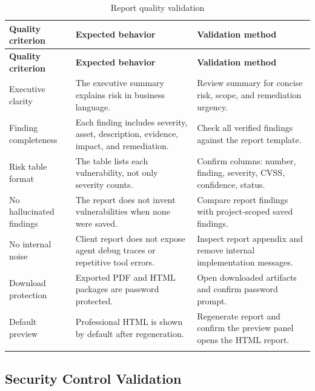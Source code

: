 \documentclass[12pt,a4paper]{report}
\begin{document}
\begin{longtable}{|p{}|p{}|p{}|}
\hline
\textbf{Quality criterion} & \textbf{Expected behavior} & \textbf{Validation
method} \\
\hline
\endfirsthead
\hline
\textbf{Quality criterion} & \textbf{Expected behavior} & \textbf{Validation
method} \\
\hline
\endhead
Executive clarity & The executive summary explains risk in business language. &
Review summary for concise risk, scope, and remediation urgency. \\
\hline
Finding completeness & Each finding includes severity, asset, description,
evidence, impact, and remediation. & Check all verified findings against the
report template. \\
\hline
Risk table format & The table lists each vulnerability, not only severity counts.
& Confirm columns: number, finding, severity, CVSS, confidence, status. \\
\hline
No hallucinated findings & The report does not invent vulnerabilities when none
were saved. & Compare report findings with project-scoped saved findings. \\
\hline
No internal noise & Client report does not expose agent debug traces or repetitive
tool errors. & Inspect report appendix and remove internal implementation
messages. \\
\hline
Download protection & Exported PDF and HTML packages are password protected. &
Open downloaded artifacts and confirm password prompt. \\
\hline
Default preview & Professional HTML is shown by default after regeneration. &
Regenerate report and confirm the preview panel opens the HTML report. \\
\hline
\caption{Report quality validation}
\label{tab:report_quality_validation}
\end{longtable}

\subsection{Security Control Validation}
\end{document}
